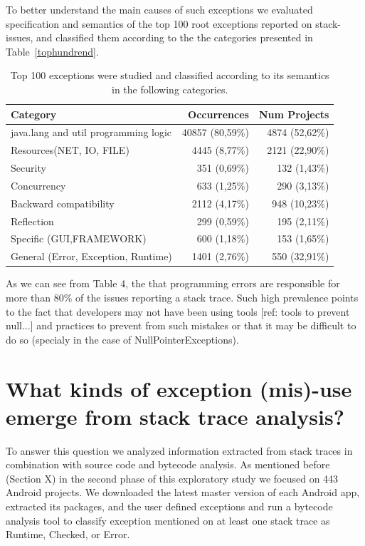 \documentclass[conference]{IEEEtran}
\begin{document}
To better understand the main causes of such exceptions we evaluated specification and semantics of the top 100 root exceptions reported on stack-issues, and classified them according to the the categories presented in Table~\ref{tophundrend}.

\begin{table}
  \centering
  \begin{tabular}{lrr}
    \hline
    \bfseries{Category} & \bfseries{Occurrences} & \bfseries{Num Projects} \\
    \hline
      java.lang and util programming logic & 40857	(80,59\%) &	4874 (52,62\%)
      \\
      Resources(NET, IO, FILE) & 4445 (8,77\%) &	2121 (22,90\%)\\
      Security & 351 (0,69\%) &	132	(1,43\%) \\
      Concurrency	& 633 (1,25\%) &	290	(3,13\%) \\
      Backward compatibility & 2112 (4,17\%) &	948	(10,23\%) \\
      Reflection &	299	(0,59\%) &	195	(2,11\%) \\
      Specific (GUI,FRAMEWORK) &	600	(1,18\%) &	153	(1,65\%)\\
      General (Error, Exception, Runtime)	& 1401 (2,76\%) & 550	(32,91\%)\\
    \hline
  \end{tabular}
  \caption{Top 100 exceptions were studied and classified according to its semantics in the following categories.}
  \label{tab:tophundrend}

\end{table}

As we can see from Table 4, the that programming errors are responsible for more than 80\% of the issues reporting a stack trace. Such high prevalence points to the fact that developers may not have been using tools [ref: tools to prevent null...] and practices to prevent from such mistakes or that it may be difficult to do so (specialy in the case of NullPointerExceptions). 

\section{What kinds of exception (mis)-use emerge from stack trace analysis? }

To answer this question we analyzed information extracted from stack traces in combination with source code and bytecode analysis. As mentioned before (Section X) in the second phase of this exploratory study we focused on 443 Android projects. We downloaded the latest master version of each Android app, extracted its packages, and the user defined exceptions and run a bytecode analysis tool to classify exception mentioned on at least one stack trace as Runtime, Checked, or Error. 
\end{document}
